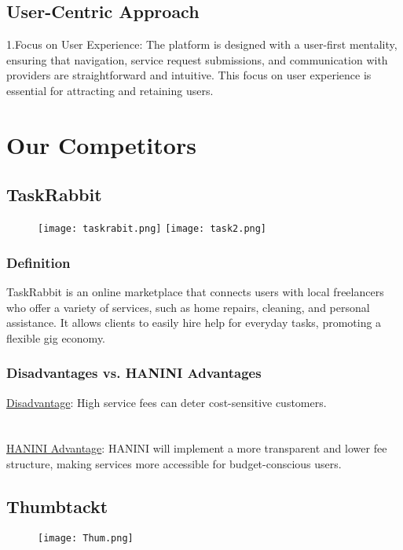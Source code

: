 \documentclass[12pt,a4paper]{report}
\begin{document}
\section{User-Centric Approach}
1.Focus on User Experience: The platform is designed with a user-first mentality, ensuring that navigation, service request submissions, and communication with providers are straightforward and intuitive. This focus on user experience is essential for attracting and retaining users.

\chapter{Our Competitors}
\section{TaskRabbit}
\begin{figure}[ht]
    \begin{center}
        \texttt{[image: taskrabit.png]}
         \texttt{[image: task2.png]}
     \end{center}
\end{figure}
\subsection*{Definition}
TaskRabbit is an online marketplace that connects users with local freelancers who offer a variety of services, such as home repairs, cleaning, and personal assistance. It allows clients to easily hire help for everyday tasks, promoting a flexible gig economy.
\subsection*{Disadvantages vs. HANINI Advantages}
\underline {Disadvantage}: High service fees can deter cost-sensitive customers.\\
\textbf{                      }\\
\textbf{                      }\\
\underline {HANINI Advantage}: HANINI will implement a more transparent and lower fee structure, making services more accessible for budget-conscious users.



\section{Thumbtackt}
\begin{figure}[ht]
    \begin{center}
        \texttt{[image: Thum.png]}
         
     \end{center}
\end{figure}
\end{document}
